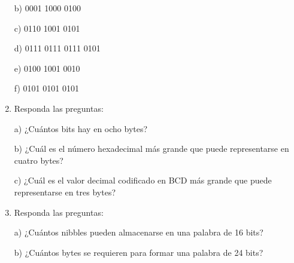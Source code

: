 \documentclass[a4paper, 12pt]{article}
\newcommand{\Aspace}{0.2cm}
\begin{document}
\begin{enumerate}
            \vspace{\Aspace} \par
            b) 0001 1000 0100
            \\ { \color{azul}  }

            \vspace{\Aspace} \par
            c) 0110 1001 0101
            \\ { \color{azul}  }

            \vspace{\Aspace} \par
            d) 0111 0111 0111 0101
            \\ { \color{azul}  }

            \vspace{\Aspace} \par
            e) 0100 1001 0010
            \\ { \color{azul}  }

            \vspace{\Aspace} \par
            f) 0101 0101 0101
            \\ { \color{azul}  }


        \item Responda las preguntas:
            \vspace{\Aspace} \par
            a) ¿Cuántos bits hay en ocho bytes?
            \\ { \color{azul}  }

            \vspace{\Aspace} \par
            b) ¿Cuál es el número hexadecimal más grande que puede representarse en cuatro bytes?
            \\ { \color{azul}  }

            \vspace{\Aspace} \par
            c) ¿Cuál es el valor decimal codificado en BCD más grande que puede representarse en tres bytes?
            \\ { \color{azul}  }


        \item Responda las preguntas:
            \vspace{\Aspace} \par
            a) ¿Cuántos nibbles pueden almacenarse en una palabra de 16 bits?
            \\ { \color{azul}  }

            \vspace{\Aspace} \par
            b) ¿Cuántos bytes se requieren para formar una palabra de 24 bits?
            \\ { \color{azul}  }
    \end{enumerate}
\end{document}
